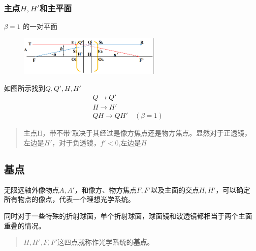     \subsubsection{主点$H,H'$和主平面}
    \begin{definition}[主平面]
    $\beta=1$ 的一对平面
    \end{definition}
    \begin{figure}[H]
        \centering
        \includegraphics[width=7cm]{img/3.1.png}
        \end{figure} 
如图所示找到$Q,Q',H,H'$
\begin{align}
    Q \to Q' \tag{3.2.3.a}\\
    H \to H' \tag{3.2.3.b}\\
    QH \to QH' \quad (\beta=1) \tag{3.2.3.c}\end{align}
\begin{quote}
{\ccwd\kaishu{}
主点H，带不带'取决于其经过是像方焦点还是物方焦点。显然对于正透镜，左边是$H'$，对于负透镜，$f'< 0$,左边是$H$

}
\end{quote}
\subsection{基点}
无限远轴外像物点$A,A'$，和像方、物方焦点$F,F'$以及主面的交点$H,H'$，可以确定所有物点的像点，代表一个理想光学系统。

同时对于一些特殊的折射球面，单个折射球面，球面镜和波透镜都相当于两个主面重叠的情况。
\begin{quote}
{\ccwd\kaishu{}
$H,H',F,F'$这四点就称作光学系统的\textbf{基点}。
}
\end{quote}
